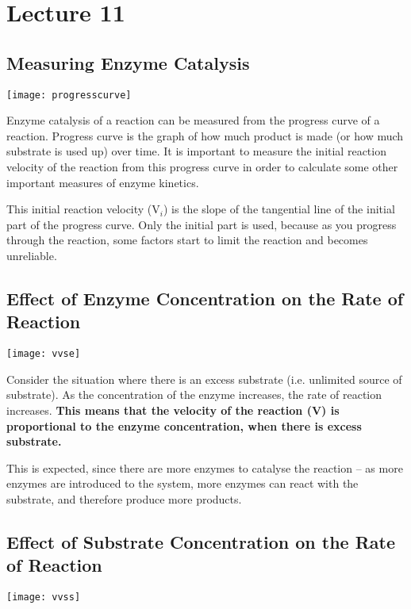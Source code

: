 \documentclass[a4paper, 12pt]{report}
\newcommand{\mychapter}[2]{
    \setcounter{chapter}{#1}
    \setcounter{section}{0}
    \chapter*{#2}
    \addcontentsline{toc}{chapter}{#2}
}
\begin{document}
\mychapter{11}{Lecture 11}

\section{Measuring Enzyme Catalysis}

\begin{center}
\texttt{[image: progresscurve]}
\end{center}

Enzyme catalysis of a reaction can be measured from the progress curve of a reaction.
Progress curve is the graph of how much product is made (or how much substrate is used up) over time.
It is important to measure the initial reaction velocity of the reaction from this progress curve in order to calculate some other important measures of enzyme kinetics.

This initial reaction velocity (V$_i$) is the slope of the tangential line of the initial part of the progress curve.
Only the initial part is used, because as you progress through the reaction, some factors start to limit the reaction and becomes unreliable.

\section{Effect of Enzyme Concentration on the Rate of Reaction}

\begin{center}
\texttt{[image: vvse]}
\end{center}

Consider the situation where there is an excess substrate (i.e. unlimited source of substrate).
As the concentration of the enzyme increases, the rate of reaction increases.
\textbf{This means that the velocity of the reaction (V) is proportional to the enzyme concentration, when there is excess substrate.}

This is expected, since there are more enzymes to catalyse the reaction -- as more enzymes are introduced to the system, more enzymes can react with the substrate, and therefore produce more products.

\section{Effect of Substrate Concentration on the Rate of Reaction}

\begin{center}
\texttt{[image: vvss]}
\end{center}
\end{document}
